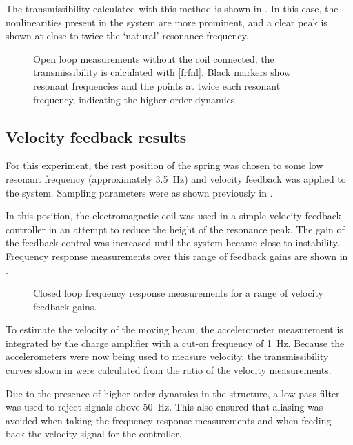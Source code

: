 The transmissibility calculated with this method is shown in
. In this case, the nonlinearities present in the
system are more prominent, and a clear peak is shown at close to twice the
`natural' resonance frequency.

\begin{figure}
  \caption{Open loop measurements without the coil connected; the transmissibility is calculated with \eqref{frfnl}. Black markers show resonant frequencies and the points at twice each resonant frequency, indicating the higher-order dynamics.}
\end{figure}

\subsection{Velocity feedback results}

For this experiment, the rest position of the spring was chosen to some low
resonant frequency (approximately \SI{3.5}{Hz}) and velocity feedback was applied
to the system. Sampling parameters were as shown previously in
.

In this position, the electromagnetic coil was used in a simple velocity
feedback controller in an attempt to reduce the height of the resonance peak.
The gain of the feedback control was increased until the system became close
to instability. Frequency response measurements over this range of feedback
gains are shown in .

\begin{figure}
  \caption{Closed loop frequency response measurements for a range of velocity feedback gains.}
\end{figure}

To estimate the velocity of the moving beam, the accelerometer measurement is
integrated by the charge amplifier with a cut-on frequency of \SI{1}{Hz}.
Because the accelerometers were now being used to measure velocity, the
transmissibility curves shown in  were calculated from the
ratio of the velocity measurements.

Due to the presence of higher-order dynamics in the structure, a low pass
filter was used to reject signals above \SI{50}{Hz}. This also ensured that
aliasing was avoided when taking the frequency response measurements and when
feeding back the velocity signal for the controller.

